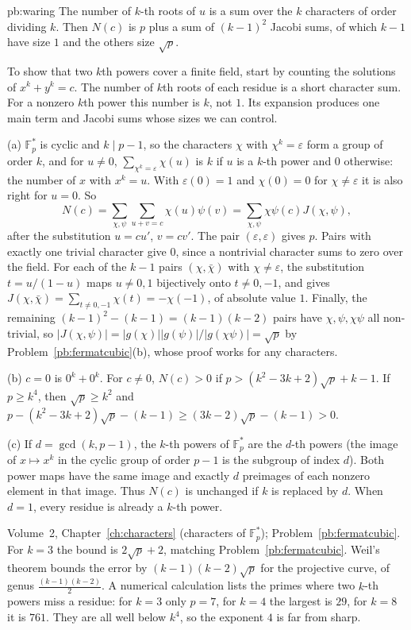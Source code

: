 \begin{solution}{pb:waring}
\idea The number of $k$-th roots of $u$ is a sum over the $k$ characters of order dividing $k$. Then $N(c)$ is $p$ plus a sum of
$(k-1)^2$ Jacobi sums, of which $k-1$ have size $1$ and the others size $\sqrt p$.

\writeup
To show that two $k$th powers cover a finite field, start by counting the solutions of $x^k+y^k=c$. The number of $k$th roots of each residue is a short character sum. For a nonzero $k$th power this number is $k$, not $1$. Its expansion produces one main term and Jacobi sums whose sizes we can control.

 (a) $\mathbb F_p^*$ is cyclic and $k\mid p-1$, so the characters $\chi$ with $\chi^k=\varepsilon$ form a group of order $k$,
and for $u\ne0$, $\sum_{\chi^k=\varepsilon}\chi(u)$ is $k$ if $u$ is a $k$-th power and $0$ otherwise: the number of $x$ with $x^k=u$.
With $\varepsilon(0)=1$ and $\chi(0)=0$ for $\chi\ne\varepsilon$ it is also right for $u=0$. So
\[
N(c)=\sum_{\chi,\psi}\sum_{u+v=c}\chi(u)\psi(v)=\sum_{\chi,\psi}\chi\psi(c)J(\chi,\psi),
\]
after the substitution $u=cu'$, $v=cv'$. The pair $(\varepsilon,\varepsilon)$ gives $p$. Pairs with exactly one trivial character give $0$, since a nontrivial character sums to zero over the field.
For each of the $k-1$ pairs $(\chi,\bar\chi)$ with $\chi\ne\varepsilon$, the substitution
$t=u/(1-u)$ maps $u\ne0,1$ bijectively onto $t\ne0,-1$, and gives
$J(\chi,\bar\chi)=\sum_{t\ne0,-1}\chi(t)=-\chi(-1)$, of absolute value $1$.
Finally, the remaining $(k-1)^2-(k-1)=(k-1)(k-2)$ pairs have $\chi,\psi,\chi\psi$ all non-trivial,
so $|J(\chi,\psi)|=|g(\chi)||g(\psi)|/|g(\chi\psi)|=\sqrt p$ by Problem~\ref{pb:fermatcubic}(b), whose proof works for any characters.

(b) $c=0$ is $0^k+0^k$. For $c\ne0$, $N(c)>0$ if $p>(k^2-3k+2)\sqrt p+k-1$. If $p\ge k^4$, then $\sqrt p\ge k^2$ and
$p-(k^2-3k+2)\sqrt p-(k-1)\ge(3k-2)\sqrt p-(k-1)>0$.

(c) If $d=\gcd(k,p-1)$, the $k$-th powers of $\mathbb F_p^*$ are the $d$-th powers (the image of $x\mapsto x^k$ in the cyclic group
of order $p-1$ is the subgroup of index $d$). Both power maps have the same image and exactly $d$ preimages of each nonzero element in that image. Thus $N(c)$ is unchanged if $k$ is replaced by $d$. When $d=1$, every residue is already a $k$-th power.

\tools Volume~2, Chapter~\ref{ch:characters} (characters of $\mathbb F_p^*$); Problem~\ref{pb:fermatcubic}.
\leads For $k=3$ the bound is $2\sqrt p+2$, matching Problem~\ref{pb:fermatcubic}. Weil's theorem bounds the error by
$(k-1)(k-2)\sqrt p$ for the projective curve, of genus $\frac{(k-1)(k-2)}2$. A numerical calculation lists the primes where two $k$-th powers
miss a residue: for $k=3$ only $p=7$, for $k=4$ the largest is $29$, for $k=8$ it is $761$. They are all well below $k^4$, so the
exponent $4$ is far from sharp.
\end{solution}

